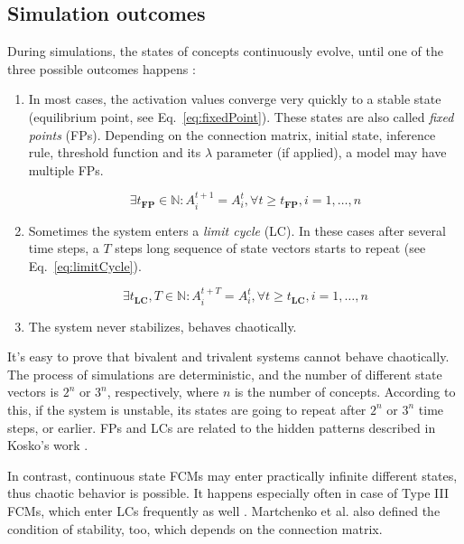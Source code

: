 \documentclass[graybox]{svmult}
\begin{document}
\subsection{Simulation outcomes}

During simulations, the states of concepts continuously evolve, until one of the three possible outcomes happens \cite{tsadiras2008comparing}:

\begin{enumerate}
  \item In most cases, the activation values converge very quickly to a stable state (equilibrium point, see Eq.~\ref{eq:fixedPoint}). These states are also called \emph{fixed points} (FPs). Depending on the connection matrix, initial state, inference rule, threshold function and its $\lambda$ parameter (if applied), a model may have multiple FPs.
  
  \begin{equation}
  \label{eq:fixedPoint}
  \exists t_{\textbf{FP}} \in \mathbb{N} : A_i^{t+1} = A_i^t, \forall t \geq t_{\textbf{FP}}, i=1, \dots, n
  \end{equation}
  
  \item Sometimes the system enters a \emph{limit cycle} (LC). In these cases after several time steps, a $T$ steps long sequence of state vectors starts to repeat (see Eq.~\ref{eq:limitCycle}).
  
  \begin{equation}
  \label{eq:limitCycle}
  \exists t_{\textbf{LC}}, T \in \mathbb{N} : A_i^{t+T} = A_i^t, \forall t \geq t_{\textbf{LC}}, i=1, \dots, n
  \end{equation}
  
  \item The system never stabilizes, behaves chaotically.
\end{enumerate}

It's easy to prove that bivalent and trivalent systems cannot behave chaotically. The process of simulations are deterministic, and the number of different state vectors is $2^n$ or $3^n$, respectively, where $n$ is the number of concepts. According to this, if the system is unstable, its states are going to repeat after $2^n$ or $3^n$ time steps, or earlier. FPs and LCs are related to the hidden patterns described in Kosko's work \cite{kosko1988hidden}.

In contrast, continuous state FCMs may enter practically infinite different states, thus chaotic behavior is possible. It happens especially often in case of Type III FCMs, which enter LCs frequently as well \cite{martchenko2003investigating}. Martchenko et al. also defined the condition of stability, too, which depends on the connection matrix.
\end{document}
